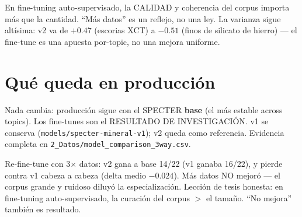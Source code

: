 \documentclass[11pt,a4paper]{article}
\begin{document}
\begin{ojo}
En fine-tuning auto-supervisado, la CALIDAD y coherencia del corpus importa más que la
cantidad. ``Más datos'' es un reflejo, no una ley. La varianza sigue altísima: v2 va de
$+0.47$ (escorias XCT) a $-0.51$ (finos de silicato de hierro) --- el fine-tune es una
apuesta por-topic, no una mejora uniforme.
\end{ojo}

\section{Qué queda en producción}

Nada cambia: producción sigue con el SPECTER \textbf{base} (el más estable across topics).
Los fine-tunes son el RESULTADO DE INVESTIGACIÓN. v1 se conserva
(\texttt{models/specter-mineral-v1}); v2 queda como referencia. Evidencia completa en
\texttt{2\_Datos/model\_comparison\_3way.csv}.

\begin{resumen}
Re-fine-tune con 3$\times$ datos: v2 gana a base 14/22 (v1 ganaba 16/22), y pierde contra
v1 cabeza a cabeza (delta medio $-0.024$). Más datos NO mejoró --- el corpus grande y
ruidoso diluyó la especialización. Lección de tesis honesta: en fine-tuning
auto-supervisado, la curación del corpus $>$ el tamaño. ``No mejora'' también es
resultado.
\end{resumen}
\end{document}
